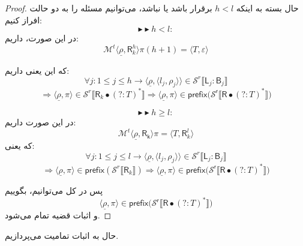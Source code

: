 \begin{proof}
حال بسته به اینکه $h<l$ برقرار باشد یا نباشد، می‌توانیم مسئله را به دو حالت افراز کنیم:
$$\blacktriangleright\blacktriangleright h<l:$$
در این صورت، داریم:
$$\mathcal{M}^t \langle \underline{\rho}, \mathsf{R}_k^h \rangle \pi(h+1)=\langle \mathit{T} , \varepsilon \rangle$$

که این یعنی داریم:
$$\forall j:1\leq j \leq h \rightarrow \langle \underline{\rho},\langle l_j, \rho_j \rangle\rangle \in \mathcal{S}^r \llbracket \mathsf{L}_j : \mathsf{B}_j \rrbracket$$
$$\Rightarrow \langle \underline{\rho}, \pi \rangle \in \mathcal{S}^r \llbracket \mathsf{R}_k \bullet (?:\mathit{T})^* \rrbracket \Rightarrow \langle \underline{\rho},\pi\rangle \in \mathsf{prefix(\mathcal{S}^r \llbracket R \bullet (?:\mathit{T})^*} \rrbracket)$$ 

$$\blacktriangleright\blacktriangleright h\geq l:$$
در این صورت داریم:
$$\mathcal{M}^t \langle\underline{\rho},\mathsf{R_k}\rangle \pi = \langle \mathit{T}, \mathsf{R}_k^l\rangle$$
که یعنی:
$$\forall j:1\leq j \leq l \rightarrow \langle \underline{\rho},\langle l_j, \rho_j \rangle\rangle \in \mathcal{S}^r \llbracket \mathsf{L}_j : \mathsf{B}_j \rrbracket$$
$$\Rightarrow \langle \underline{\rho}, \pi \rangle \in \mathsf{prefix}(\mathcal{S}^r \llbracket \mathsf{R}_k\rrbracket) \Rightarrow \langle \underline{\rho},\pi\rangle \in \mathsf{prefix(\mathcal{S}^r \llbracket R \bullet (?:\mathit{T})^*} \rrbracket)$$ 

پس در کل می‌توانیم، بگوییم
$$\langle \underline{\rho},\pi\rangle \in \mathsf{prefix(\mathcal{S}^r \llbracket R \bullet (?:\mathit{T})^*} \rrbracket)$$
و اثبات قضیه تمام می‌شود.
\end{proof}

حال به اثبات تمامیت می‌پردازیم.

